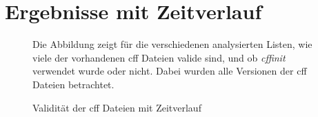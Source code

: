 \section{Ergebnisse mit Zeitverlauf}
\label{sec:gesamtheit_ergebnisse}

\begin{figure}
    
    \label{fig:overall_full_valid_cff}
    \caption{Validität der \gls{cff} Dateien mit Zeitverlauf}
    \small
    Die Abbildung zeigt für die verschiedenen analysierten Listen, wie viele der vorhandenen \gls{cff} Dateien valide sind, und ob \emph{cffinit} verwendet wurde oder nicht. Dabei wurden alle Versionen der \gls{cff} Dateien betrachtet.
\end{figure}

